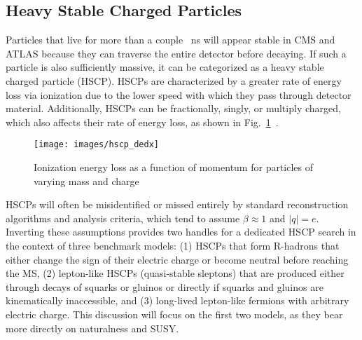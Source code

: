 \documentclass[12pt]{article}
\begin{document}
    \subsection{Heavy Stable Charged Particles}
        Particles that live for more than a couple \SI{}{\nano\s} will appear stable in CMS and ATLAS because they can traverse the entire detector before decaying. If such a particle is also sufficiently massive, it can be categorized as a heavy stable charged particle (HSCP). HSCPs are characterized by a greater rate of energy loss via ionization due to the lower speed with which they pass through detector material. Additionally, HSCPs can be fractionally, singly, or multiply charged, which also affects their rate of energy loss, as shown in Fig.~\ref{hscp_dedx}~\cite{cms_hscp}.

        \noindent \begin{figure}[htbp] \begin{center}
        \texttt{[image: images/hscp\_dedx]}
            \caption{Ionization energy loss as a function of momentum for particles of varying mass and charge~\cite{cms_hscp}}
        \label{hscp_dedx}
        \end{center} \end{figure}

        HSCPs will often be misidentified or missed entirely by standard reconstruction algorithms and analysis criteria, which tend to assume $\beta \approx \num{1}$ and $\lvert q \rvert = e$. Inverting these assumptions provides two handles for a dedicated HSCP search in the context of three benchmark models: (1) HSCPs that form R-hadrons that either change the sign of their electric charge or become neutral before reaching the MS, (2) lepton-like HSCPs (quasi-stable sleptons) that are produced either through decays of squarks or gluinos or directly if squarks and gluinos are kinematically inaccessible, and (3) long-lived lepton-like fermions with arbitrary electric charge. This discussion will focus on the first two models, as they bear more directly on naturalness and SUSY.

         
\end{document}
